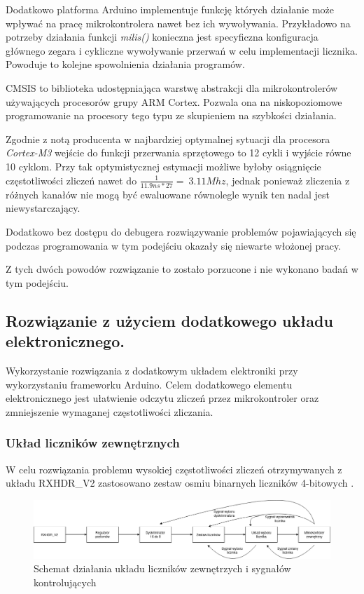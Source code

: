 \documentclass[a4paper,12pt]{article}
\begin{document}
Dodatkowo platforma Arduino implementuje funkcję których działanie może wpływać na pracę mikrokontrolera nawet bez ich wywoływania. 
Przykładowo na potrzeby działania funkcji \textit{milis()} konieczna jest specyficzna konfiguracja głównego zegara i cykliczne wywoływanie przerwań w celu implementacji licznika. Powoduje to kolejne spowolnienia działania programów. 


CMSIS to biblioteka udostępniająca warstwę abstrakcji dla mikrokontrolerów używających procesorów grupy ARM Cortex. 
Pozwala ona na niskopoziomowe programowanie na procesory tego typu ze skupieniem na szybkości działania.

Zgodnie z notą producenta \cite{interupt latency} w najbardziej optymalnej sytuacji dla procesora \textit{Cortex-M3} wejście do funkcji przerwania sprzętowego to 12 cykli i wyjście równe 10 cyklom. 
Przy tak optymistycznej estymacji możliwe byłoby osiągnięcie częstotliwości zliczeń nawet do $\frac{1}{11.9ns*27} = ~ 3.11 Mhz$, jednak ponieważ zliczenia z różnych kanałów nie mogą być ewaluowane równolegle wynik ten nadal jest niewystarczający. 

Dodatkowo bez dostępu do debugera rozwiązywanie problemów pojawiających się podczas programowania w tym podejściu okazały się niewarte włożonej pracy. 

Z tych dwóch powodów rozwiązanie to zostało porzucone i nie wykonano badań w tym podejściu. 


\subsection{Rozwiązanie z użyciem dodatkowego układu elektronicznego.}

Wykorzystanie rozwiązania z dodatkowym układem elektroniki przy wykorzystaniu frameworku Arduino. Celem dodatkowego elementu elektronicznego jest ułatwienie odczytu zliczeń przez mikrokontroler oraz zmniejszenie wymaganej częstotliwości zliczania. 

\subsubsection{Układ liczników zewnętrznych}
\label{section licziki}

W celu rozwiązania problemu wysokiej częstotliwości zliczeń otrzymywanych z układu RXHDR\_V2 \cite{master} zastosowano zestaw osmiu binarnych liczników 4-bitowych \cite{licznik doc}. 


\begin{figure}[]
        \centering
        \includegraphics[width=\textwidth]{Elektronika_flow_chart.png}
        \caption{Schemat działania układu liczników zewnętrzych i sygnałów kontrolujących}
        \label{licznik flowchart}
\end{figure}
\end{document}
